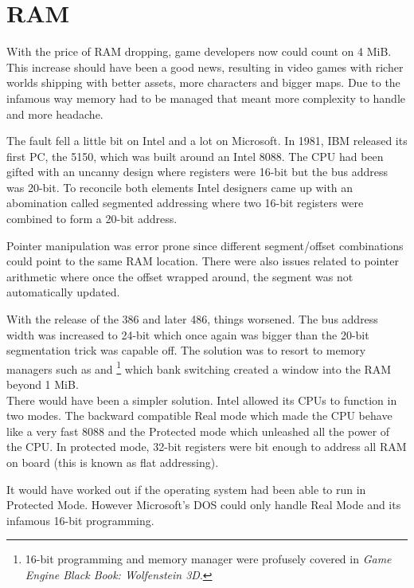 \section{RAM}
With the price of RAM dropping, game developers now could count on 4 MiB. This increase should have been a good news, resulting in video games with richer worlds shipping with better assets, more characters and bigger maps. Due to the infamous way memory had to be managed that meant more complexity to handle and more headache.\\
\par
The fault fell a little bit on Intel and a lot on Microsoft. In 1981, IBM released its first PC, the 5150,  which was built around an Intel 8088. The CPU had been gifted with an uncanny design where registers were 16-bit but the bus address was 20-bit. To reconcile both elements Intel designers came up with an abomination called segmented addressing where two 16-bit registers were combined to form a 20-bit address.\\
\par


\par
Pointer manipulation was error prone since different segment/offset combinations could point to the same RAM location. There were also issues related to pointer arithmetic where once the offset wrapped around, the segment was not automatically updated.\\
\par
With the release of the 386 and later 486, things worsened. The bus address width was increased to 24-bit which once again was bigger than the 20-bit segmentation trick was capable off. The solution was to resort to memory managers such as  and \footnote{16-bit programming and memory manager were profusely covered in \textit{Game Engine Black Book: Wolfenstein 3D}.} which  bank switching created a window into the RAM beyond 1 MiB.\\

There would have been a simpler solution. Intel allowed its CPUs to function in two modes. The backward compatible Real mode which made the CPU behave like a very fast 8088 and the Protected mode which unleashed all the power of the CPU. In protected mode, 32-bit registers were bit enough to address all RAM on board (this is known as flat addressing).\\
\par
It would have worked out if the operating system had been able to run in Protected Mode. However Microsoft's DOS could only handle Real Mode and its infamous 16-bit programming.\\ 
\par




